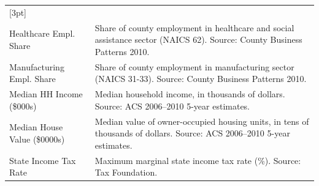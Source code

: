 \begin{table}[htbp!]
\begin{tabular}{p{3.5cm}p{12cm}}
[3pt]
\hline
\multicolumn{2}{l}{\textit{Economic Variables (2010 baseline)}} \\
Healthcare Empl. Share & Share of county employment in healthcare and social assistance sector (NAICS 62). Source: County Business Patterns 2010. \\
[3pt]
Manufacturing Empl. Share & Share of county employment in manufacturing sector (NAICS 31-33). Source: County Business Patterns 2010. \\
[3pt]
Median HH Income (\$000s) & Median household income, in thousands of dollars. Source: ACS 2006--2010 5-year estimates. \\
[3pt]
Median House Value (\$0000s) & Median value of owner-occupied housing units, in tens of thousands of dollars. Source: ACS 2006--2010 5-year estimates. \\
[3pt]
State Income Tax Rate & Maximum marginal state income tax rate (\%). Source: Tax Foundation. \\
[3pt]
\hline\hline
\end{tabular}
\end{table}
